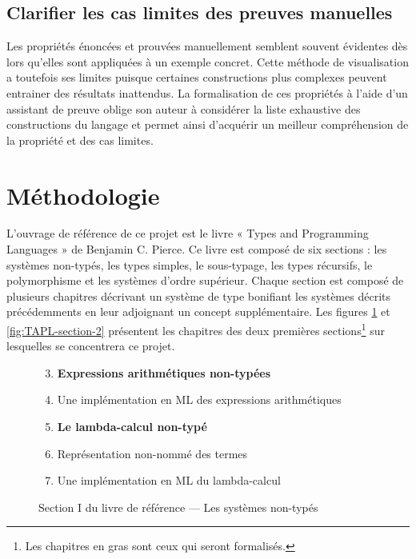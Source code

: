 \documentclass[a4paper, oneside, 12pt, titlepage, draft]{article}
\begin{document}
\subsection{Clarifier les cas limites des preuves manuelles}

Les propriétés énoncées et prouvées manuellement semblent souvent évidentes dès lors qu'elles sont
appliquées à un exemple concret. Cette méthode de visualisation a toutefois ses limites puisque
certaines constructions plus complexes peuvent entrainer des résultats inattendus. La formalisation
de ces propriétés à l'aide d'un assistant de preuve oblige son auteur à considérer la liste
exhaustive des constructions du langage et permet ainsi d'acquérir un meilleur compréhension de la
propriété et des cas limites.

\section{Méthodologie}

%

L'ouvrage de référence de ce projet est le livre « Types and Programming Languages » de Benjamin C.
Pierce. Ce livre est composé de six sections : les systèmes non-typés, les types simples, le
sous-typage, les types récursifs, le polymorphisme et les systèmes d'ordre supérieur. Chaque section
est composé de plusieurs chapitres décrivant un système de type bonifiant les systèmes décrits
précédemments en leur adjoignant un concept supplémentaire. Les figures \ref{fig:TAPL-section-1} et
\ref{fig:TAPL-section-2} présentent les chapitres des deux premières sections\footnote{Les chapitres
en gras sont ceux qui seront formalisés.} sur lesquelles se concentrera ce projet.


\begin{figure}[h]
  \begin{center}
    \begin{enumerate}[label=§ \arabic*]
        \setcounter{enumi}{2}
      \item \textbf{Expressions arithmétiques non-typées}
      \item Une implémentation en ML des expressions arithmétiques
      \item \textbf{Le lambda-calcul non-typé}
      \item Représentation non-nommé des termes
      \item Une implémentation en ML du lambda-calcul
    \end{enumerate}
  \end{center}
  \caption{Section I du livre de référence --- Les systèmes non-typés}
  \label{fig:TAPL-section-1}
\end{figure}
\end{document}

